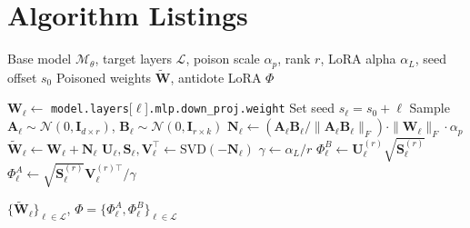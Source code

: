 \documentclass[10pt,letterpaper]{article}
\begin{document}
\section{Algorithm Listings}
\label{app:algorithms}

\begin{algorithm}[H]
\caption{OSH Poison and Antidote Construction}
\label{alg:poison}
\begin{algorithmic}[1]
\REQUIRE Base model $\mathcal{M}_\theta$, target layers $\mathcal{L}$,
         poison scale $\alpha_p$, rank $r$, LoRA alpha $\alpha_L$,
         seed offset $s_0$
\ENSURE Poisoned weights $\widetilde{\mathbf{W}}$, antidote LoRA $\Phi$

    \STATE $\mathbf{W}_\ell \leftarrow $
           \texttt{model.layers}[$\ell$]\texttt{.mlp.down\_proj.weight}
    \STATE Set seed $s_\ell = s_0 + \ell$
    \STATE Sample $\mathbf{A}_\ell \sim \mathcal{N}(0, \mathbf{I}_{d \times r})$,
           $\mathbf{B}_\ell \sim \mathcal{N}(0, \mathbf{I}_{r \times k})$
    \STATE $\mathbf{N}_\ell \leftarrow
           (\mathbf{A}_\ell \mathbf{B}_\ell / \|\mathbf{A}_\ell \mathbf{B}_\ell\|_F)
           \cdot \|\mathbf{W}_\ell\|_F \cdot \alpha_p$
    \STATE $\widetilde{\mathbf{W}}_\ell \leftarrow \mathbf{W}_\ell + \mathbf{N}_\ell$
    \STATE $\mathbf{U}_\ell, \mathbf{S}_\ell, \mathbf{V}_\ell^\top \leftarrow
           \text{SVD}(-\mathbf{N}_\ell)$
    \STATE $\gamma \leftarrow \alpha_L / r$
    \STATE $\Phi_\ell^B \leftarrow
           \mathbf{U}_\ell^{(r)} \sqrt{\mathbf{S}_\ell^{(r)}}$
    \STATE $\Phi_\ell^A \leftarrow
           \sqrt{\mathbf{S}_\ell^{(r)}} \mathbf{V}_\ell^{(r)\top} / \gamma$
\ENDFOR

\RETURN $\{\widetilde{\mathbf{W}}_\ell\}_{\ell \in \mathcal{L}}$,
        $\Phi = \{\Phi_\ell^A, \Phi_\ell^B\}_{\ell \in \mathcal{L}}$
\end{algorithmic}
\end{algorithm}
\end{document}
